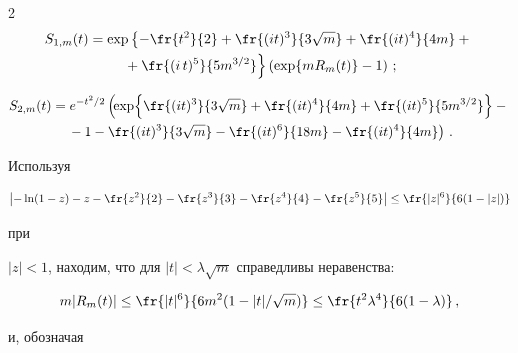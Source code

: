 \begin{multicols}{2}
\begin{multline*}


S_{1,m}(t) = \exp\left\{-\fr{t^2}{2} +\fr{(it)^3}{3\sqrt{m}}+


\fr{(it)^4}{4m}+{}\right.\\


\left.{}+\fr{(i\,t)^5}{5m^{3/2}}\right\}\left(\exp\{mR_m(t)\}-1\right)\,;


\end{multline*} 





\vspace*{-12pt}





\noindent


\begin{multline*}


 S_{2,m}(t)=e^{-t^2/2}\left(\!\exp\!\left\{\fr{(it)^3}{3\sqrt{m}}+\fr{(it)^4}{4m} +


 \fr{ (it)^5}{ 5m^{3/2}}\right\}-{}\right.\hspace*{-0.5347pt}\\


\left.{}-1-\fr{(it)^3}{3\sqrt{m}}-\fr{(it)^6}{18m}-\fr{(it)^4}{4m}\right)\,.


\end{multline*}





Используя 


$$


\left| -\ln(1-z) -z -\fr{z^2}{2} - \fr{z^3}{3} - \fr{z^4}{4} - \fr{z^5}{5} \right| \leq \fr{|z|^6}{6(1-|z|)}


$$ 


при 


$|z| < 1$, находим, что для  $|t| < \lambda \sqrt{m}$ справедливы неравенства:





\noindent


$$


m|R_m(t)|\leq \fr{  |t|^6}{  6m^2(1-|t|/\sqrt{m})}


\leq \fr{t^2\lambda^4}{6(1- \lambda)}\,,


$$


и, обозначая 





\noindent



\end{multicols}
